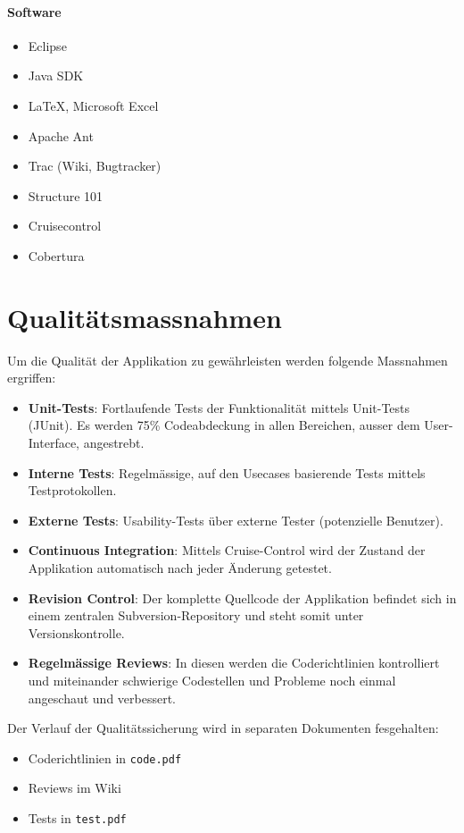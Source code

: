 \documentclass[12pt,halfparskip]{scrartcl}
\begin{document}
\paragraph{Software}
\begin{itemize}
	\item Eclipse
	\item Java SDK
	\item \LaTeX{}, Microsoft Excel
	\item Apache Ant
	\item Trac (Wiki, Bugtracker)
	\item Structure 101
	\item Cruisecontrol
	\item Cobertura
\end{itemize}


\section{Qualitätsmassnahmen}

Um die Qualität der Applikation zu gewährleisten werden folgende Massnahmen ergriffen:
\begin{itemize}
	\item \textbf{Unit-Tests}: Fortlaufende Tests der Funktionalität mittels Unit-Tests (JUnit). Es werden 75\% Codeabdeckung in allen Bereichen, ausser dem User-Interface, angestrebt.
	\item \textbf{Interne Tests}: Regelmässige, auf den Usecases basierende Tests mittels Testprotokollen.
	\item \textbf{Externe Tests}: Usability-Tests über externe Tester (potenzielle Benutzer).
	\item \textbf{Continuous Integration}: Mittels Cruise-Control wird der Zustand der Applikation automatisch nach jeder Änderung getestet.
	\item \textbf{Revision Control}: Der komplette Quellcode der Applikation befindet sich in einem zentralen Subversion-Repository und steht somit unter Versionskontrolle.
	\item \textbf{Regelmässige Reviews}: In diesen werden die Coderichtlinien kontrolliert und miteinander schwierige Codestellen und Probleme noch einmal angeschaut und verbessert.
\end{itemize}

Der Verlauf der Qualitätssicherung wird in separaten Dokumenten fesgehalten:
\begin{itemize}
	\item Coderichtlinien in \texttt{code.pdf}
	\item Reviews im Wiki
	\item Tests in \texttt{test.pdf}
\end{itemize}
\end{document}
